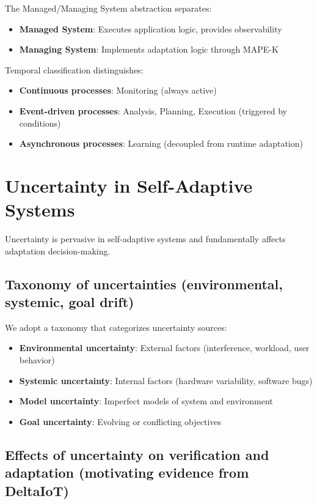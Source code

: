 \documentclass[11pt,a4paper]{article}
\begin{document}
The Managed/Managing System abstraction separates:

\begin{itemize}
    \item \textbf{Managed System}: Executes application logic, provides observability
    \item \textbf{Managing System}: Implements adaptation logic through MAPE-K
\end{itemize}

Temporal classification distinguishes:
\begin{itemize}
    \item \textbf{Continuous processes}: Monitoring (always active)
    \item \textbf{Event-driven processes}: Analysis, Planning, Execution (triggered by conditions)
    \item \textbf{Asynchronous processes}: Learning (decoupled from runtime adaptation)
\end{itemize}

\section{Uncertainty in Self-Adaptive Systems}

Uncertainty is pervasive in self-adaptive systems and fundamentally affects adaptation decision-making.

\subsection{Taxonomy of uncertainties (environmental, systemic, goal drift)}

We adopt a taxonomy that categorizes uncertainty sources:

\begin{itemize}
    \item \textbf{Environmental uncertainty}: External factors (interference, workload, user behavior)
    \item \textbf{Systemic uncertainty}: Internal factors (hardware variability, software bugs)
    \item \textbf{Model uncertainty}: Imperfect models of system and environment
    \item \textbf{Goal uncertainty}: Evolving or conflicting objectives
\end{itemize}

\subsection{Effects of uncertainty on verification and adaptation (motivating evidence from DeltaIoT)}
\end{document}
